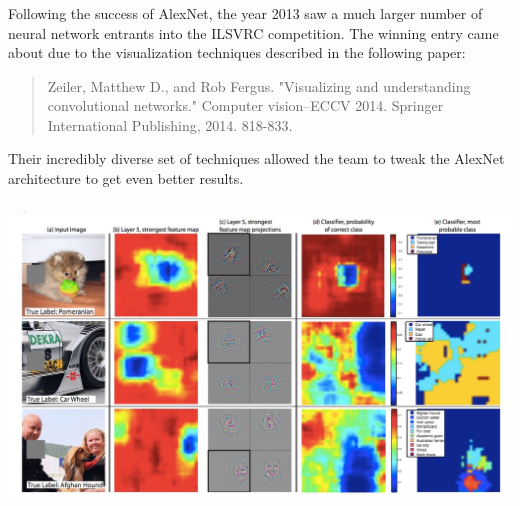 \documentclass[xetex,mathserif,serif,aspectratio=169]{beamer}
\begin{document}
\begin{frame}[fragile] \frametitle{} \oldB \small


Following the success of AlexNet, the year 2013 saw a much
larger number of neural network entrants into the ILSVRC
competition. The winning entry came about due to the
visualization techniques described in the following paper:
\begin{quote}
Zeiler, Matthew D., and Rob Fergus. "Visualizing and understanding convolutional networks." Computer vision–ECCV 2014. Springer International Publishing, 2014. 818-833.
\end{quote}
Their incredibly diverse set of techniques allowed the team
to tweak the AlexNet architecture to get even better results.

\end{frame}

\begin{frame}[fragile] \frametitle{} \oldB \small

\begin{center}
\includegraphics[width=\textwidth]{img/vizCover.jpg}
\end{center}

\end{frame}
\end{document}
